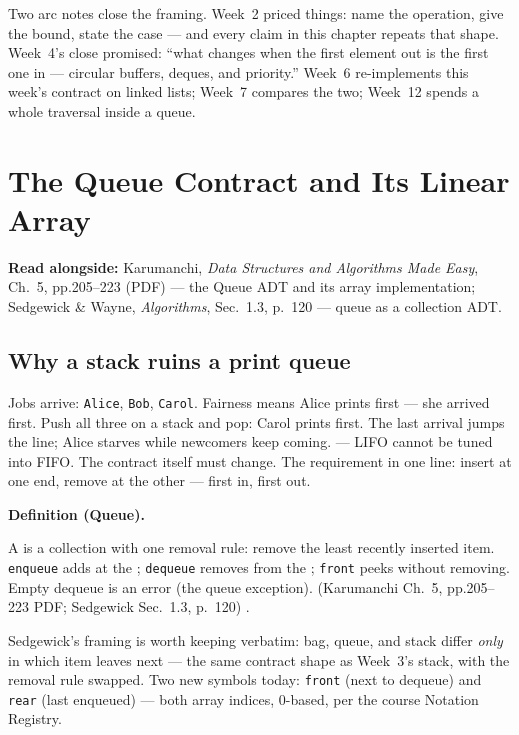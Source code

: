 \documentclass[11pt]{article}
\newenvironment{definitionbox}[1]{%
  \par\noindent\textbf{Definition (#1).}\ \itshape
}{\par\vspace{0.3em}}
\begin{document}
Two arc notes close the framing. Week~2 priced things: name the operation, give the bound, state the case --- and every claim in this chapter repeats that shape. Week~4's close promised: ``what changes when the first element out is the first one in --- circular buffers, deques, and priority.'' Week~6 re-implements this week's contract on linked lists; Week~7 compares the two; Week~12 spends a whole traversal inside a queue. 

\section{The Queue Contract and Its Linear Array}

\textbf{Read alongside:} Karumanchi, \textit{Data Structures and Algorithms Made Easy}, Ch.~5, pp.205--223 (PDF) --- the Queue ADT and its array implementation; Sedgewick \& Wayne, \textit{Algorithms}, Sec.~1.3, p.~120 --- queue as a collection ADT.

\subsection{Why a stack ruins a print queue}

Jobs arrive: \texttt{Alice}, \texttt{Bob}, \texttt{Carol}. Fairness means Alice prints first --- she arrived first. Push all three on a stack and pop: Carol prints first. The last arrival jumps the line; Alice starves while newcomers keep coming.  --- LIFO cannot be tuned into FIFO. The contract itself must change. The requirement in one line: insert at one end, remove at the other --- first in, first out.

\begin{definitionbox}{Queue}
A  is a collection with one removal rule: remove the least recently inserted item. \texttt{enqueue} adds at the ; \texttt{dequeue} removes from the ; \texttt{front} peeks without removing. Empty dequeue is an error (the queue exception). (Karumanchi Ch.~5, pp.205--223 PDF; Sedgewick Sec.~1.3, p.~120) \cite{Karumanchi2017_data_structures_algorithms_made_easy,Sedgewick2011_algorithms}.
\end{definitionbox}

Sedgewick's framing is worth keeping verbatim: bag, queue, and stack differ \emph{only} in which item leaves next --- the same contract shape as Week~3's stack, with the removal rule swapped. Two new symbols today: \texttt{front} (next to dequeue) and \texttt{rear} (last enqueued) --- both array indices, 0-based, per the course Notation Registry.
\end{document}
